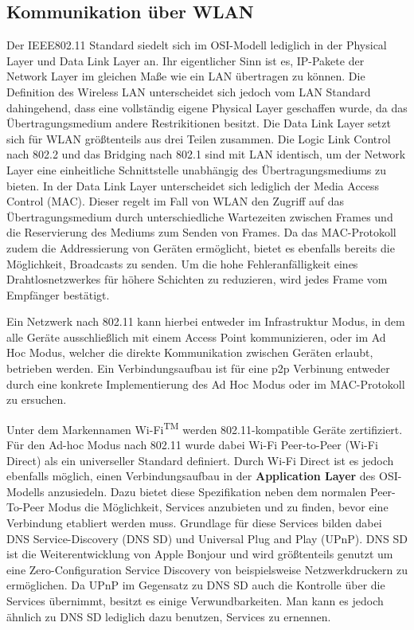     \subsection{Kommunikation über WLAN}
        Der IEEE802.11 Standard siedelt sich im OSI-Modell lediglich in der Physical Layer und Data Link Layer an. Ihr eigentlicher Sinn ist es,
        IP-Pakete der Network Layer im gleichen Maße wie ein LAN übertragen zu können.
        Die Definition des Wireless LAN unterscheidet sich jedoch vom LAN Standard dahingehend, dass eine vollständig eigene Physical Layer geschaffen wurde,
        da das Übertragungsmedium andere Restrikitionen besitzt. Die Data Link Layer setzt sich für WLAN größtenteils aus drei Teilen zusammen.
        Die Logic Link Control nach 802.2 und das Bridging nach 802.1 sind mit LAN identisch, um der Network Layer eine einheitliche Schnittstelle unabhängig des Übertragungsmediums zu bieten.
        In der Data Link Layer unterscheidet sich lediglich der Media Access Control (MAC).\cite[S.311]{Sauter}
        Dieser regelt im Fall von WLAN den Zugriff auf das Übertragungsmedium durch unterschiedliche Wartezeiten zwischen Frames und die Reservierung des Mediums zum Senden von Frames.
        Da das MAC-Protokoll zudem die Addressierung von Geräten ermöglicht, bietet es ebenfalls bereits die Möglichkeit, Broadcasts zu senden.
        Um die hohe Fehleranfälligkeit eines Drahtlosnetzwerkes für höhere Schichten zu reduzieren, wird jedes Frame vom Empfänger bestätigt.\cite[S.325-327]{Sauter}
        
        Ein Netzwerk nach 802.11 kann hierbei entweder im Infrastruktur Modus, in dem alle Geräte ausschließlich mit einem Access Point kommunizieren,
        oder im Ad Hoc Modus, welcher die direkte Kommunikation zwischen Geräten erlaubt, betrieben werden.\cite[S.82]{Sikora}
        Ein Verbindungsaufbau ist für eine p2p Verbinung entweder durch eine konkrete Implementierung des Ad Hoc Modus oder
        im MAC-Protokoll zu ersuchen.

        Unter dem Markennamen Wi-Fi\textsuperscript{TM} werden 802.11-kompatible Geräte zertifiziert.\cite[S.80]{Sikora}
        Für den Ad-hoc Modus nach 802.11 wurde dabei Wi-Fi Peer-to-Peer (Wi-Fi Direct)\textregistered\cite{wifiDirect} als ein universeller Standard definiert.
        Durch Wi-Fi Direct ist es jedoch ebenfalls möglich, einen Verbindungsaufbau in der {\bf Application Layer} des OSI-Modells anzusiedeln.
        Dazu bietet diese Spezifikation neben dem normalen Peer-To-Peer Modus die Möglichkeit, Services anzubieten und zu finden, bevor eine Verbindung etabliert werden muss.
        Grundlage für diese Services bilden dabei DNS Service-Discovery (DNS SD) und Universal Plug and Play (UPnP).
        DNS SD ist die Weiterentwicklung von Apple Bonjour und wird größtenteils genutzt um eine Zero-Configuration Service Discovery von beispielsweise Netzwerkdruckern zu ermöglichen. Da UPnP im Gegensatz zu DNS SD auch die Kontrolle über die Services übernimmt, besitzt es einige Verwundbarkeiten. Man kann es jedoch ähnlich zu DNS SD lediglich dazu benutzen, Services zu ernennen.\cite{Esnaashari}
    
